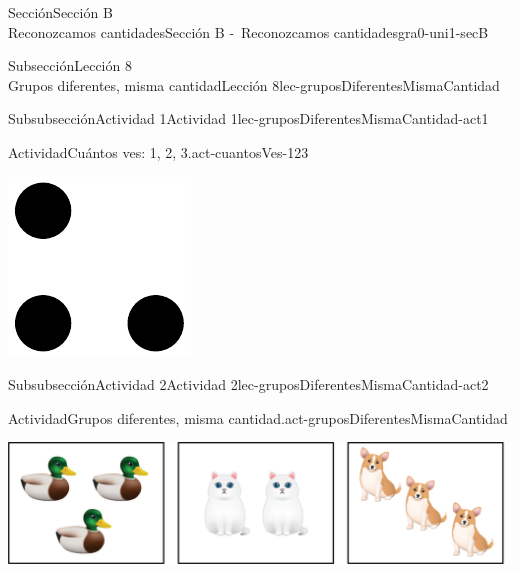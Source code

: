 \begin{sectionptx}{Sección}{{\Large Sección B\\}Reconozcamos cantidades}{}{Sección B -~Reconozcamos cantidades}{}{}{gra0-uni1-secB}
\begin{subsectionptx}{Subsección}{{\normalsize Lección 8\\[-0.05cm]}Grupos diferentes, misma cantidad}{}{Lección 8}{}{}{lec-gruposDiferentesMismaCantidad}
\begin{subsubsectionptx}{Subsubsección}{Actividad 1}{}{Actividad 1}{}{}{lec-gruposDiferentesMismaCantidad-act1}
\begin{activity}{Actividad}{Cuántos ves: 1, 2, 3.}{act-cuantosVes-123}
\begin{sidebyside}{3}{0.0416666666666667}{0.0416666666666667}{0.0833333333333333}
\begin{sbspanel}{0.25}
\includegraphics[max width=\linewidth, center]{external/svg-source/tikz-file-136324.pdf}
\end{sbspanel}%
\end{sidebyside}%
\end{activity}%
\end{subsubsectionptx}
%
%
\typeout{************************************************}
\typeout{************************************************}
%
\begin{subsubsectionptx}{Subsubsección}{Actividad 2}{}{Actividad 2}{}{}{lec-gruposDiferentesMismaCantidad-act2}
\begin{activity}{Actividad}{Grupos diferentes, misma cantidad.}{act-gruposDiferentesMismaCantidad}%
\begin{image}{0}{1}{0}{}%
\includegraphics[max width=\linewidth, center]{external/png-source/K.1.C Beta Student Workbook.AnimalGroups.png}
\end{image}%
%
\end{activity}%

\end{subsubsectionptx}
\end{subsectionptx}
\end{sectionptx}
